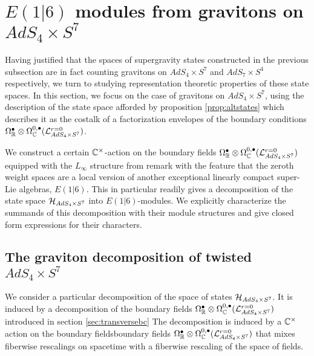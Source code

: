 %
%
%



%
%
%
\section{$E(1|6)$ modules from gravitons on $AdS_4\times S^7$}\label{sec:e16}

Having justified that the spaces of supergravity states constructed in the previous subsection are in fact counting gravitons on $AdS_4\times S^7$ and $AdS_7\times S^4$ respectively, we turn to studying representation theoretic properties of these state spaces. In this section, we focus on the case of gravitons on $AdS_4\times S^7$, using the description of the state space afforded by proposition \ref{prop:altstates} which describes it as the costalk of a factorization envelopes of the boundary conditions $\Omega^\bullet _{\mathbb{R}}\otimes \Omega^{0,\bullet}_{\mathbb{C}} (\mathcal{L}^{{r=0}}_{AdS_4\times S^7} )$.

We construct a certain $\mathbb{C}^\times$-action on the boundary fields $\Omega^\bullet _{\mathbb{R}}\otimes \Omega^{0,\bullet}_{\mathbb{C}} (\mathcal{L}^{{r=0}}_{AdS_4\times S^7} )$ equipped with the $L_\infty$ structure from remark \label{rmk:nottransferred} with the feature that the zeroth weight spaces are a local version of another exceptional linearly compact super-Lie algebras, $E(1|6)$. This in particular readily gives a decomposition of the state space $\mathcal{H}_{AdS_4\times S^7}$ into $E(1|6)$-modules. We explicitly characterize the summands of this decomposition with their module structures and give closed form expressions for their characters.

\subsection{The graviton decomposition of twisted $AdS_4\times S^7$}
\parsec{}
We consider a particular decomposition of the space of states $\mathcal{H}_{AdS_4\times S^7}$. It is induced by a decomposition of the boundary fields $\Omega^\bullet_{\mathbb{R}}\otimes \Omega^{0,\bullet}_{\mathbb{C}} (\mathcal{L}^{{r=0}}_{AdS_4\times S^7} )$ introduced in section \ref{sec:transversebc}  The decomposition is induced by a $\mathbb{C}^\times$ action on the boundary fieldsboundary fields $\Omega^\bullet_{\mathbb{R}} \otimes \Omega^{0,\bullet}_{\mathbb{C}} (\mathcal{L}^{{r=0}}_{AdS_4\times S^7} )$ that mixes fiberwise rescalings on spacetime with a fiberwise rescaling of the space of fields. 

